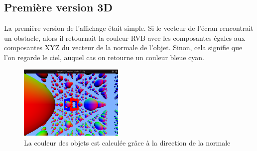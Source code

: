 \subsection{Première version 3D}
La première version de l'affichage était simple. Si le vecteur de l'écran rencontrait un obstacle, alors il retournait la couleur RVB avec les composantes égales aux composantes XYZ du vecteur de la normale de l'objet. Sinon, cela signifie que l'on regarde le ciel, auquel cas on retourne un couleur bleue cyan.
\begin{figure}[h]
    \centering
    \includegraphics[width=5cm]{images/screens/couleurnormale.png}
    \caption{La couleur des objets est calculée grâce à la direction de la normale}
    \label{fig:firstpreview}
\end{figure}